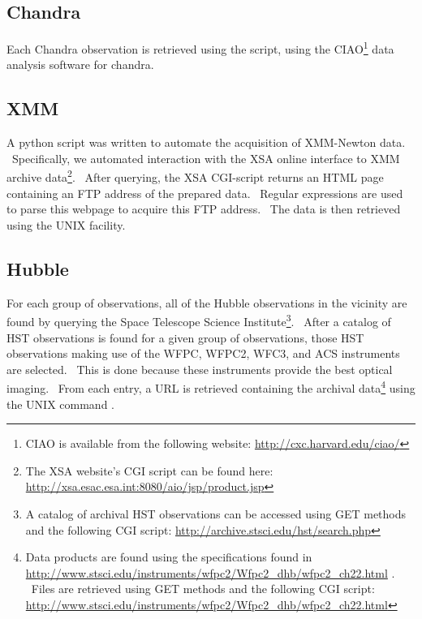 \documentclass{amsart}
\newcommand{\tmtexttt}[1]{{\ttfamily{#1}}}
\begin{document}
\subsection{Chandra}

Each Chandra observation is retrieved using the
\tmtexttt{download\_chandra\_obsid} script, using the CIAO{\footnote{CIAO is
available from the following website:
\href{http://cxc.harvard.edu/ciao/}{http://cxc.harvard.edu/ciao/}}} data
analysis software for chandra.

\subsection{XMM}

A python script was written to automate the acquisition of XMM-Newton data. \
Specifically, we automated interaction with the XSA online interface to XMM
archive data{\footnote{The XSA website's CGI script can be found here:
\href{http://xsa.esac.esa.int:8080/aio/jsp/product.jsp}{http://xsa.esac.esa.int:8080/aio/jsp/product.jsp}}}.
\ After querying, the XSA CGI-script returns an HTML page containing an FTP
address of the prepared data. \ Regular expressions are used to parse this
webpage to acquire this FTP address. \ The data is then retrieved using the
UNIX \tmtexttt{wget} facility.

\subsection{Hubble}

For each group of observations, all of the Hubble observations in the vicinity
are found by querying the Space Telescope Science Institute{\footnote{A
catalog of archival HST observations can be accessed using GET methods and the
following CGI script:
\href{http://archive.stsci.edu/hst/search.php}{http://archive.stsci.edu/hst/search.php}}}.
\ After a catalog of HST observations is found for a given group of
observations, those HST observations making use of the WFPC, WFPC2, WFC3, and
ACS instruments are selected. \ This is done because these instruments provide
the best optical imaging. \ From each entry, a URL is retrieved containing the
archival data{\footnote{Data products are found using the specifications found
in
\href{http://www.stsci.edu/instruments/wfpc2/Wfpc2\_dhb/wfpc2\_ch22.html}{http://www.stsci.edu/instruments/wfpc2/Wfpc2\_dhb/wfpc2\_ch22.html}
. \ Files are retrieved using GET methods and the following CGI script:
\href{http://www.stsci.edu/instruments/wfpc2/Wfpc2\_dhb/wfpc2\_ch22.html}{http://www.stsci.edu/instruments/wfpc2/Wfpc2\_dhb/wfpc2\_ch22.html}}}
using the UNIX command \tmtexttt{wget}.
\end{document}
